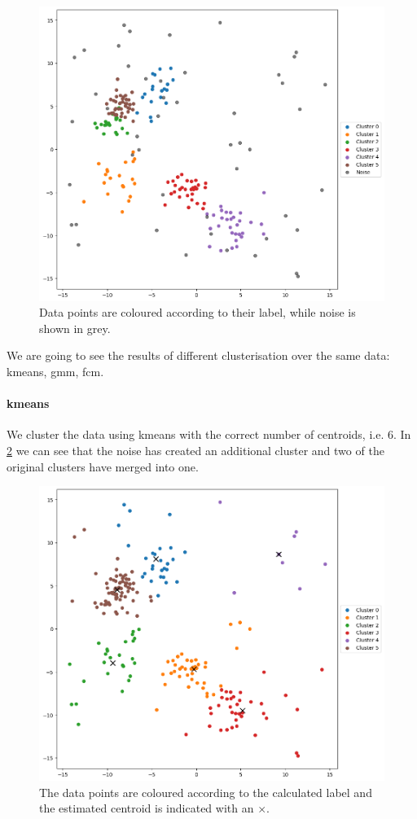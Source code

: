 \begin{figure}[H]
    \centering
    \includegraphics[width=0.9\linewidth]{Figures/dati_veri.png}
    \caption[Example of data for clustering]{Data points are coloured according to their label, while noise is shown in grey.}
    \label{fig:data_true}
\end{figure}

\begin{toReview}
	We are going to see the results of different clusterisation over the same data: \gls{kmeans}, \gls{gmm}, \gls{fcm}.
\end{toReview}
\paragraph{\gls{kmeans}} We cluster the data using \gls{kmeans} with the correct number of centroids, i.e. $6$. In \cref{fig:data_kmeans} we can see that the noise has created an additional cluster and two of the original clusters have merged into one.
\begin{figure}[H]
	\centering
	\includegraphics[width=0.9\linewidth]{Figures/dati_kmeans.png}
	\caption[Example of \gls{kmeans} clustering]{The data points are coloured according to the calculated label and the estimated centroid is indicated with an $\times$.}
	\label{fig:data_kmeans}
\end{figure}

